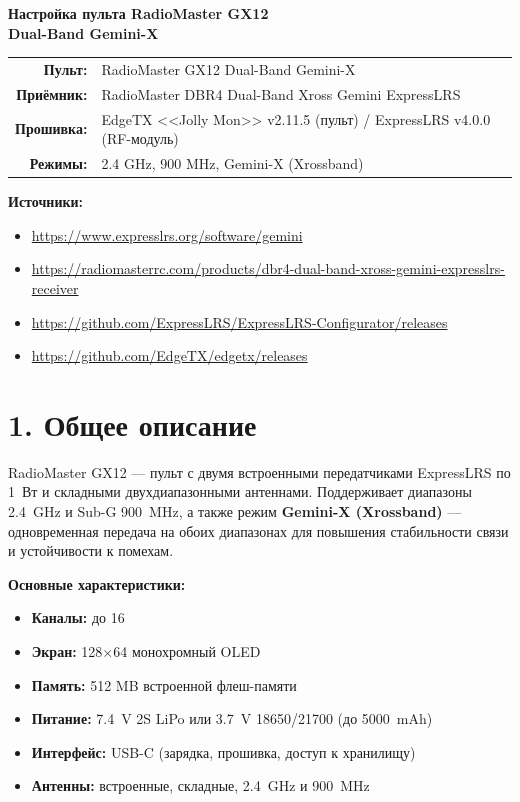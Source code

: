 \documentclass[a4paper,11pt]{article}
\begin{document}
\begin{center}
  {\LARGE\bfseries\color{accent} Настройка пульта RadioMaster GX12\\Dual-Band Gemini-X}\\[1.5em]
  \begin{tabular}{rl}
    \textbf{Пульт:}     & RadioMaster GX12 Dual-Band Gemini-X \\
    \textbf{Приёмник:}   & RadioMaster DBR4 Dual-Band Xross Gemini ExpressLRS \\
    \textbf{Прошивка:}   & EdgeTX <<Jolly Mon>> v2.11.5 (пульт) / ExpressLRS v4.0.0 (RF-модуль) \\
    \textbf{Режимы:}     & 2.4 GHz, 900 MHz, Gemini-X (Xrossband) \\
  \end{tabular}
\end{center}

\vspace{0.5em}
\noindent\textbf{Источники:}
\begin{itemize}[nosep]
  \item \url{https://www.expresslrs.org/software/gemini}
  \item \url{https://radiomasterrc.com/products/dbr4-dual-band-xross-gemini-expresslrs-receiver}
  \item \url{https://github.com/ExpressLRS/ExpressLRS-Configurator/releases}
  \item \url{https://github.com/EdgeTX/edgetx/releases}
\end{itemize}

\vspace{1em}
\tableofcontents
\newpage

\section{1. Общее описание}

RadioMaster GX12 --- пульт с двумя встроенными передатчиками ExpressLRS по 1~Вт и складными двухдиапазонными антеннами. Поддерживает диапазоны 2.4~GHz и Sub-G 900~MHz, а также режим \textbf{Gemini-X (Xrossband)} --- одновременная передача на обоих диапазонах для повышения стабильности связи и устойчивости к помехам.

\textbf{Основные характеристики:}
\begin{itemize}[nosep]
  \item \textbf{Каналы:} до 16
  \item \textbf{Экран:} 128$\times$64 монохромный OLED
  \item \textbf{Память:} 512 MB встроенной флеш-памяти
  \item \textbf{Питание:} 7.4~V 2S LiPo или 3.7~V 18650/21700 (до 5000~mAh)
  \item \textbf{Интерфейс:} USB-C (зарядка, прошивка, доступ к хранилищу)
  \item \textbf{Антенны:} встроенные, складные, 2.4~GHz и 900~MHz
\end{itemize}
\end{document}
